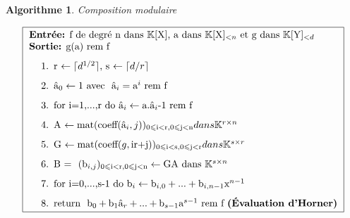 \documentclass[a4paper]{article}
\begin{document}
\theoremstyle{algorithme}
\newtheorem*{al}{Algorithme}
\begin{al} 
Composition modulaire 

\[
\fbox{
    \begin{minipage}[c]{11cm}
        \textbf{Entrée:} f de degré n dans $\mathbb{K}[\mathrm{X}]$, a dans $\mathbb{K}[\mathrm{X}]_{<n}$ et \text{g} dans $\mathbb{K}[\mathrm{Y}]_{<d}$\\
        \textbf{Sortie:} \text{g(a) rem f}
        \begin{enumerate}
        \item \text{r} $\leftarrow \lceil d^{1/2} \rceil$, \text{s} $\leftarrow \lceil d/r \rceil$ 
        \item $\text{â}_{0} \leftarrow 1$ \text{avec } $\text{â}_{i}=\text{a}^{i} \text{ rem f}$
        \item \text{for i=1,...,r do} $\text{â}_{i} \leftarrow \text{a}.\text{â}_{i} \text{-1 rem f}$
        \item \text{A} $\leftarrow \text{mat}(\text{coeff}(\text{â}_{i},j))_{0\leqslant \text{i}<\text{r}, 0\leqslant \text{j}<\text{n}}  dans \mathbb{K}^{r\times n}$
        \item \text{G} $\leftarrow \text{mat}(\text{coeff}(g,\text{ir+j}))_{0\leqslant \text{i}<\text{s}, 0\leqslant \text{j}<\text{r}}  dans \mathbb{K}^{s\times r}$
        \item \text{B = } $(\text{b}_{i,j})_{0\leqslant \text{i}<\text{r}, 0\leqslant \text{j}<\text{n}} \leftarrow \text{GA } \text{dans } \mathbb{K}^{s\times n}$
        \item \text{for i=0,...,s-1 do} $\text{b}_{i} \leftarrow \text{b}_{i,0}+...+\text{b}_{i,n-1}\text{x}^{n-1}$
        \item \text{return } $\text{b}_{0}+\text{b}_{1}\text{â}_{r}+...+\text{b}_{s-1}\text{a}^{s-1} \text{ rem f } \textbf{(Évaluation d'Horner)}$ 
        \end{enumerate}
    \end{minipage}
}
\]
\end{al}
\end{document}
